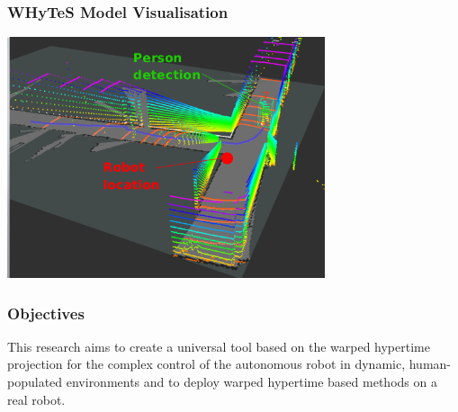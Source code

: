 
\begin{frame}
	\frametitle{WHyTeS Model Visualisation}
    \vspace{3mm}
    \href{run:./video/WHyTeS_visualisation.mp4}{\includegraphics[width=0.7\textwidth]{fig/corridor_datasetb.png}}
\end{frame}


\begin{frame}
    \frametitle{Objectives}
    \vspace{3mm}
This research aims to create a universal tool based on the warped hypertime projection for the complex control of the autonomous robot in dynamic, human-populated environments and to deploy warped hypertime based methods on a real robot.
\end{frame}



